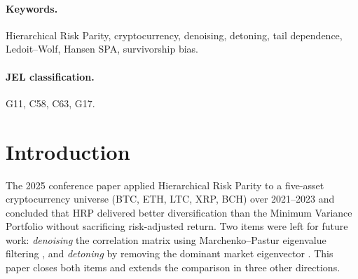 \documentclass[11pt,a4paper]{article}
\begin{document}
\paragraph{Keywords.} Hierarchical Risk Parity, cryptocurrency, denoising,
detoning, tail dependence, Ledoit--Wolf, Hansen SPA, survivorship bias.

\paragraph{JEL classification.} G11, C58, C63, G17.

\section{Introduction}

The 2025 conference paper \citep{matys2025maci} applied Hierarchical Risk Parity
\citep{lopezdeprado2016hrp} to a five-asset cryptocurrency universe
(BTC, ETH, LTC, XRP, BCH) over 2021--2023 and concluded that HRP
delivered better diversification than the Minimum Variance Portfolio
without sacrificing risk-adjusted return. Two items were left for
future work: \emph{denoising} the correlation matrix using
Marchenko--Pastur eigenvalue filtering \citep{marchenko1967,laloux1999},
and \emph{detoning} by removing the dominant market eigenvector
\citep{lopezdeprado2020mlam}. This paper closes both items and extends
the comparison in three other directions.
\end{document}
